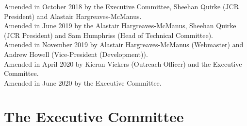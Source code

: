 \documentclass[12pt]{article}
\begin{document}
Amended in October 2018 by the Executive Committee, Sheehan Quirke (JCR President) and Alastair Hargreaves-McManus.\\
Amended in June 2019 by the Alastair Hargreaves-McManus, Sheehan Quirke (JCR President) and Sam Humphriss (Head of Technical Committee).\\
Amended in November 2019 by Alastair Hargreaves-McManus (Webmaster) and Andrew Howell (Vice-President (Development)).\\
Amended in April 2020 by Kieran Vickers (Outreach Officer) and the Executive Committee.\\
Amended in June 2020 by the Executive Committee.
\newpage
\tableofcontents{}
\newpage
\section{The Executive Committee}
\end{document}
